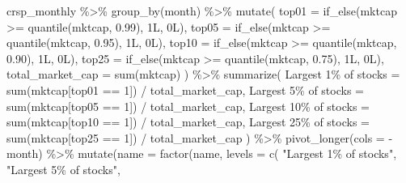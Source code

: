 \documentclass[
]{krantz}
\newenvironment{Shaded}{\begin{snugshade}}{\end{snugshade}}
\newcommand{\AttributeTok}[1]{\textcolor[rgb]{0.61,0.61,0.61}{#1}}
\newcommand{\DecValTok}[1]{\textcolor[rgb]{0.06,0.06,0.06}{#1}}
\newcommand{\FloatTok}[1]{\textcolor[rgb]{0.06,0.06,0.06}{#1}}
\newcommand{\FunctionTok}[1]{\textcolor[rgb]{0,0,0}{#1}}
\newcommand{\NormalTok}[1]{#1}
\newcommand{\OtherTok}[1]{\textcolor[rgb]{0.37,0.37,0.37}{#1}}
\newcommand{\SpecialCharTok}[1]{\textcolor[rgb]{0,0,0}{#1}}
\newcommand{\StringTok}[1]{\textcolor[rgb]{0.5,0.5,0.5}{#1}}
\begin{document}
\begin{Shaded}
\begin{Highlighting}[]
\NormalTok{crsp\_monthly }\SpecialCharTok{\%\textgreater{}\%}
  \FunctionTok{group\_by}\NormalTok{(month) }\SpecialCharTok{\%\textgreater{}\%}
  \FunctionTok{mutate}\NormalTok{(}
    \AttributeTok{top01 =} \FunctionTok{if\_else}\NormalTok{(mktcap }\SpecialCharTok{\textgreater{}=} \FunctionTok{quantile}\NormalTok{(mktcap, }\FloatTok{0.99}\NormalTok{), 1L, 0L),}
    \AttributeTok{top05 =} \FunctionTok{if\_else}\NormalTok{(mktcap }\SpecialCharTok{\textgreater{}=} \FunctionTok{quantile}\NormalTok{(mktcap, }\FloatTok{0.95}\NormalTok{), 1L, 0L),}
    \AttributeTok{top10 =} \FunctionTok{if\_else}\NormalTok{(mktcap }\SpecialCharTok{\textgreater{}=} \FunctionTok{quantile}\NormalTok{(mktcap, }\FloatTok{0.90}\NormalTok{), 1L, 0L),}
    \AttributeTok{top25 =} \FunctionTok{if\_else}\NormalTok{(mktcap }\SpecialCharTok{\textgreater{}=} \FunctionTok{quantile}\NormalTok{(mktcap, }\FloatTok{0.75}\NormalTok{), 1L, 0L),}
    \AttributeTok{total\_market\_cap =} \FunctionTok{sum}\NormalTok{(mktcap)}
\NormalTok{  ) }\SpecialCharTok{\%\textgreater{}\%}
  \FunctionTok{summarize}\NormalTok{(}
    \StringTok{\textasciigrave{}}\AttributeTok{Largest 1\% of stocks}\StringTok{\textasciigrave{}} \OtherTok{=} \FunctionTok{sum}\NormalTok{(mktcap[top01 }\SpecialCharTok{==} \DecValTok{1}\NormalTok{]) }\SpecialCharTok{/}\NormalTok{ total\_market\_cap,}
    \StringTok{\textasciigrave{}}\AttributeTok{Largest 5\% of stocks}\StringTok{\textasciigrave{}} \OtherTok{=} \FunctionTok{sum}\NormalTok{(mktcap[top05 }\SpecialCharTok{==} \DecValTok{1}\NormalTok{]) }\SpecialCharTok{/}\NormalTok{ total\_market\_cap,}
    \StringTok{\textasciigrave{}}\AttributeTok{Largest 10\% of stocks}\StringTok{\textasciigrave{}} \OtherTok{=} \FunctionTok{sum}\NormalTok{(mktcap[top10 }\SpecialCharTok{==} \DecValTok{1}\NormalTok{]) }\SpecialCharTok{/}\NormalTok{ total\_market\_cap,}
    \StringTok{\textasciigrave{}}\AttributeTok{Largest 25\% of stocks}\StringTok{\textasciigrave{}} \OtherTok{=} \FunctionTok{sum}\NormalTok{(mktcap[top25 }\SpecialCharTok{==} \DecValTok{1}\NormalTok{]) }\SpecialCharTok{/}\NormalTok{ total\_market\_cap}
\NormalTok{  ) }\SpecialCharTok{\%\textgreater{}\%}
  \FunctionTok{pivot\_longer}\NormalTok{(}\AttributeTok{cols =} \SpecialCharTok{{-}}\NormalTok{month) }\SpecialCharTok{\%\textgreater{}\%}
  \FunctionTok{mutate}\NormalTok{(}\AttributeTok{name =} \FunctionTok{factor}\NormalTok{(name, }\AttributeTok{levels =} \FunctionTok{c}\NormalTok{(}
    \StringTok{"Largest 1\% of stocks"}\NormalTok{, }\StringTok{"Largest 5\% of stocks"}\NormalTok{,}

\end{Highlighting}
\end{Shaded}
\end{document}
